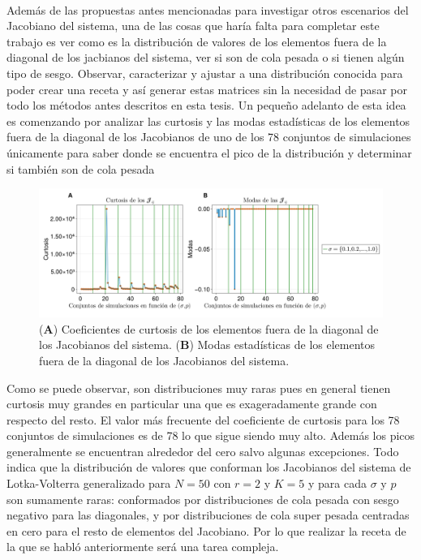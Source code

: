 \documentclass[a4paper,11pt]{book}
\theoremstyle{plain}
\theoremstyle{definition}
\begin{document}
\\
Además de las propuestas antes mencionadas para investigar otros escenarios del Jacobiano del sistema, una de las cosas que haría falta para completar este trabajo es ver como es la distribución de valores de los elementos fuera de la diagonal de los jacbianos del sistema, ver si son de cola pesada o si tienen algún tipo de sesgo. Observar, caracterizar y ajustar a una distribución conocida para poder crear una receta y así generar estas matrices sin la necesidad de pasar por todo los métodos antes descritos en esta tesis. Un pequeño adelanto de esta idea es comenzando por analizar las curtosis y las modas estadísticas de los elementos fuera de la diagonal de los Jacobianos de uno  de los 78 conjuntos de simulaciones únicamente para saber donde se encuentra el pico de la distribución y determinar si también son de cola pesada
\begin{figure}[h!]
	\centering
	\includegraphics[scale=0.16]{../Imagenes/CurModasJij}
	\caption{(\textbf{A}) Coeficientes de curtosis de los elementos fuera de la diagonal de los Jacobianos del sistema. (\textbf{B}) Modas estadísticas de los elementos fuera de la diagonal de los Jacobianos del sistema.}
	\label{fig:CurModasJij}
\end{figure}

Como se puede observar, son distribuciones muy raras pues en general tienen curtosis muy grandes en particular una que es exageradamente grande con respecto del resto. El valor más frecuente del coeficiente de curtosis para los 78 conjuntos de simulaciones es de 78 lo que sigue siendo muy alto. Además los picos generalmente se encuentran alrededor del cero salvo algunas excepciones. Todo indica que la distribución de valores que conforman los Jacobianos del sistema de Lotka-Volterra generalizado para $N=50$ con $r=2$ y $K=5$ y para cada $\sigma$ y $p$ son sumamente raras: conformados por distribuciones de cola pesada con sesgo negativo para las diagonales, y por distribuciones de cola super pesada centradas en cero para el resto de elementos del Jacobiano. Por lo que realizar la receta de la que se habló anteriormente será una tarea compleja.
\newpage

	
	
	
	
\end{document}
